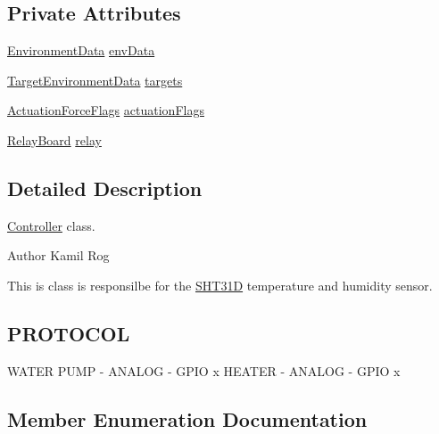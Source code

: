 \subsection*{Private Attributes}
\begin{DoxyCompactItemize}
\item 
\hyperlink{structEnvironmentData}{Environment\+Data} \hyperlink{classController_ac99088334f56588243867ca1c18f9633}{env\+Data}
\item 
\hyperlink{structTargetEnvironmentData}{Target\+Environment\+Data} \hyperlink{classController_a8f2fb8295fd3da6ebc8bdb0f25036322}{targets}
\item 
\hyperlink{structActuationForceFlags}{Actuation\+Force\+Flags} \hyperlink{classController_adb38d16eaea1f98887b3c1fc75ab5bd3}{actuation\+Flags}
\item 
\hyperlink{classRelayBoard}{Relay\+Board} \hyperlink{classController_aa3f1d7aae706a5440adf520cbd7fb216}{relay}
\end{DoxyCompactItemize}


\subsection{Detailed Description}
\hyperlink{classController}{Controller} class. 

\begin{DoxyAuthor}{Author}
Kamil Rog
\end{DoxyAuthor}
This is class is responsilbe for the \hyperlink{classSHT31D}{S\+H\+T31D} temperature and humidity sensor.\hypertarget{classController_PROTOCOL}{}\subsection{P\+R\+O\+T\+O\+C\+OL}\label{classController_PROTOCOL}
W\+A\+T\+ER P\+U\+MP -\/ A\+N\+A\+L\+OG -\/ G\+P\+IO x H\+E\+A\+T\+ER -\/ A\+N\+A\+L\+OG -\/ G\+P\+IO x 

\subsection{Member Enumeration Documentation}
\mbox{\label{classController_ae0cc6feb81bc46e0859390fd1551ff43}} 
